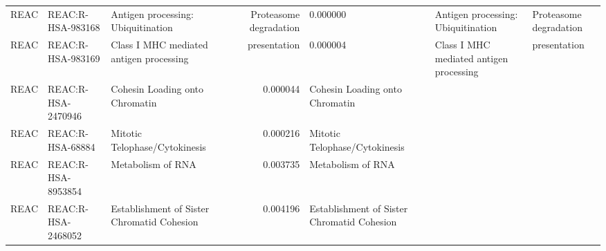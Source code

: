 \begin{tabular}{lllrl}
REAC & REAC:R-HSA-983168 & Antigen processing: Ubiquitination & Proteasome degradation & 0.000000 & Antigen processing: Ubiquitination & Proteasome degradation \\
REAC & REAC:R-HSA-983169 & Class I MHC mediated antigen processing & presentation & 0.000004 & Class I MHC mediated antigen processing & presentation \\
REAC & REAC:R-HSA-2470946 & Cohesin Loading onto Chromatin & 0.000044 & Cohesin Loading onto Chromatin \\
REAC & REAC:R-HSA-68884 & Mitotic Telophase/Cytokinesis & 0.000216 & Mitotic Telophase/Cytokinesis \\
REAC & REAC:R-HSA-8953854 & Metabolism of RNA & 0.003735 & Metabolism of RNA \\
REAC & REAC:R-HSA-2468052 & Establishment of Sister Chromatid Cohesion & 0.004196 & Establishment of Sister Chromatid Cohesion \\
\bottomrule
\end{tabular}
